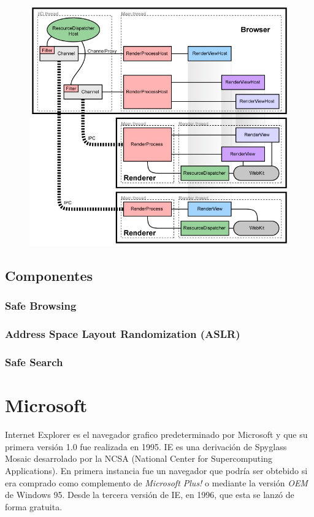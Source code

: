 \begin{figure}[h!t]
    \begin{center}
		\includegraphics[scale=0.5]{figures/archGC.jpg}
      \label{fig:archG}
    \end{center}
\end{figure}

\subsection{Componentes}
	\subsubsection{Safe Browsing}

	\subsubsection{Address Space Layout Randomization (ASLR)}

	\subsubsection{Safe Search} %

\section{Microsoft}
Internet Explorer es el navegador grafico predeterminado por Microsoft y que su primera versión 1.0 fue realizada en 1995. IE es una derivación de Spyglass Mosaic desarrolado por la NCSA (National Center for Supercomputing Applications). En primera instancia fue un navegador que podría ser obtebido si era comprado como complemento de \textit{Microsoft Plus!} o mediante la versión \textit{OEM} de Windows 95. Desde la tercera versión de IE, en 1996, que esta se lanzó de forma gratuita.
        
